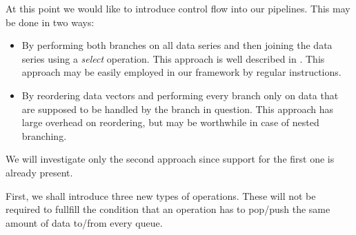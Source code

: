 At this point we would like to introduce control flow into our pipelines. This may be done in two ways:

\begin{itemize}
  \item By performing both branches on all data series and then joining the data series using a \emph{select} operation. This approach is well described in \cite{secondpaper}. This approach may be easily employed in our framework by regular instructions. 
  \item By reordering data vectors and performing every branch only on data that are supposed to be handled by the branch in question. This approach has large overhead on reordering, but may be worthwhile in case of nested branching.
\end{itemize}

We will investigate only the second approach since support for the first one is already present.

\parspace

First, we shall introduce three new types of operations. These will not be required to fullfill the condition that an operation has to pop/push the same amount of data to/from every queue. 

